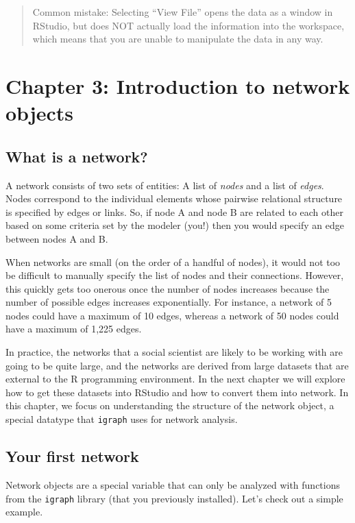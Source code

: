 \documentclass[
]{book}
\begin{document}
\begin{quote}
Common mistake: Selecting ``View File'' opens the data as a window in RStudio, but does NOT actually load the information into the workspace, which means that you are unable to manipulate the data in any way.
\end{quote}

\chapter{Chapter 3: Introduction to network objects}\label{ch3}

\section{What is a network?}\label{what-is-a-network}

A network consists of two sets of entities: A list of \emph{nodes} and a list of \emph{edges}. Nodes correspond to the individual elements whose pairwise relational structure is specified by edges or links. So, if node A and node B are related to each other based on some criteria set by the modeler (you!) then you would specify an edge between nodes A and B.

When networks are small (on the order of a handful of nodes), it would not too be difficult to manually specify the list of nodes and their connections. However, this quickly gets too onerous once the number of nodes increases because the number of possible edges increases exponentially. For instance, a network of 5 nodes could have a maximum of 10 edges, whereas a network of 50 nodes could have a maximum of 1,225 edges.

In practice, the networks that a social scientist are likely to be working with are going to be quite large, and the networks are derived from large datasets that are external to the R programming environment. In the next chapter we will explore how to get these datasets into RStudio and how to convert them into network. In this chapter, we focus on understanding the structure of the network object, a special datatype that \texttt{igraph} uses for network analysis.

\section{Your first network}\label{your-first-network}

Network objects are a special variable that can only be analyzed with functions from the \texttt{igraph} library (that you previously installed).
Let's check out a simple example.
\end{document}
